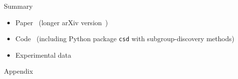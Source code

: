 \documentclass[en, navbaroff]{sdqbeamer}
\begin{document}
\begin{frame}[t]{Summary}
\begin{itemize}
		\begin{itemize}
			\item Paper~\cite{bach2025subgroup} (longer arXiv version~\cite{bach2025using})
			\item Code~\cite{bach2025constrained} (including Python package \texttt{csd} with subgroup-discovery methods)
			\item Experimental data~\cite{bach2025experimental}
		\end{itemize}
	\end{itemize}
\end{frame}

\appendix
\beginbackup %

\begin{frame}[plain]
	\centering
	\Huge Appendix
\end{frame}
\end{document}
